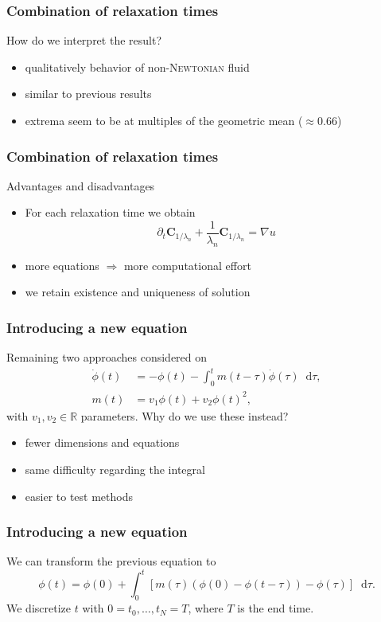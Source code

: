 \documentclass[12pt,a4paper,handout]{beamer}
\theoremstyle{definition}
\theoremstyle{plain}
\newcommand{\rr}{\mathbb{R}}
\newcommand{\bfC}{\bm{C}}
\newcommand{\D}{\mathop{}\!\mathrm{d}}
\begin{document}
\begin{frame}
\frametitle{Combination of relaxation times}
    How do we interpret the result?
    \begin{itemize}[<+->]
        \item qualitatively behavior of non-\textsc{Newtonian} fluid
        \item similar to previous results
        \item extrema seem to be at multiples of the geometric mean ($\approx 0.66$)  
    \end{itemize}
\end{frame}
\begin{frame}
    \frametitle{Combination of relaxation times}
    Advantages and disadvantages
    \begin{itemize}[<+->]
        \item For each relaxation time we obtain
        \begin{equation*}
            \partial_t \bfC_{1/\lambda_n}+\frac{1}{\lambda_n}\bfC_{1/\lambda_n}=\nabla u
        \end{equation*}
        \item more equations $\Rightarrow$ more computational effort
        \item we retain existence and uniqueness of solution
    \end{itemize}
\end{frame}
\begin{frame}
    \frametitle{Introducing a new equation}
    Remaining two approaches considered on
    \begin{align*}
    \dot\phi(t)&=-\phi(t)-\int_0^tm(t-\tau)\dot\phi(\tau)\D\tau,\\
    m(t)&=v_1\phi(t)+v_2\phi(t)^2,
    \end{align*}
    with $v_1,v_2\in\rr$ parameters. Why do we use these instead?
    \begin{itemize}[<+->]
        \item fewer dimensions and equations
        \item same difficulty regarding the integral
        \item easier to test methods
    \end{itemize}
\end{frame}
\begin{frame}
    \frametitle{Introducing a new equation}
    We can transform the previous equation to 
    \begin{equation*}
        \phi(t)=\phi(0)+\int_0^t[m(\tau)(\phi(0)-\phi(t-\tau))-\phi(\tau)]\D \tau.
    \end{equation*}
    We discretize $t$ with $0=t_0,\dotsc,t_N=T$, where $T$ is the end time.
\end{frame}
\end{document}
